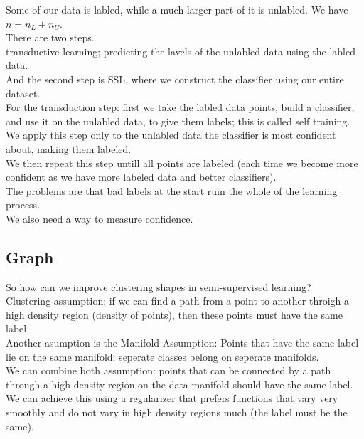 \documentclass[12pt]{article}
\begin{document}
Some of our data is labled, while a much larger part
of it is unlabled.
We have $n = n_L + n_U$. \\

There are two steps. \\
transductive learning; predicting the
lavels of the unlabled data using the labled data. \\
And the second step is SSL, where we construct the
classifier using our entire dataset. \\

For the transduction step:
first we take the labled data points, build a classifier,
and use it on the unlabled data, to give them labels;
this is called self training. \\
We apply this step only to the unlabled data
the classifier is most confident about,
making them labeled. \\
We then repeat this step untill all points are labeled
(each time we become more confident as we have
more labeled data and better classifiers). \\

The problems are that bad labels at the start ruin the
whole of the learning process. \\
We also need a way to measure confidence. \\

\newpage

\subsection*{Graph}

So how can we improve clustering shapes
in semi-supervised learning? \\

Clustering assumption; if we can find a path from
a point to another throigh a high density
region (density of points), then these points
must have the same label. \\

Another asumption is the Manifold Assumption:
Points that have the same label lie on the same manifold;
seperate classes belong on seperate manifolds. \\

We can combine both assumption: points that can be
connected by a path through a high density region
on the data manifold should have the same label. \\
We can achieve this using a regularizer that prefers
functions that vary very smoothly and do not vary in
high density regions much (the label must be the same). \\
\end{document}
